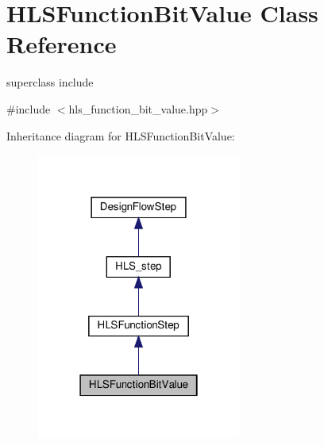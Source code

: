 \hypertarget{classHLSFunctionBitValue}{}\section{H\+L\+S\+Function\+Bit\+Value Class Reference}
\label{classHLSFunctionBitValue}


superclass include  




{\ttfamily \#include $<$hls\+\_\+function\+\_\+bit\+\_\+value.\+hpp$>$}



Inheritance diagram for H\+L\+S\+Function\+Bit\+Value\+:
\nopagebreak
\begin{figure}[H]
\begin{center}
\leavevmode
\includegraphics[width=190pt]{d6/d20/classHLSFunctionBitValue__inherit__graph}
\end{center}
\end{figure}


